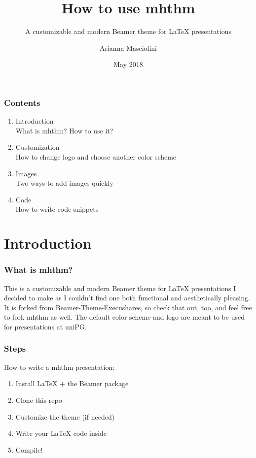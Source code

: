 \documentclass{beamer}
\title{How to use mhthm}
\subtitle{A customizable and modern Beamer theme for LaTeX presentations}
\author{Arianna Masciolini}
\institute{UniPG}
\date{May 2018}
\begin{document}
	\setcounter{showProgressBar}{0}
	\setcounter{showSlideNumbers}{0}

	\frame{\titlepage}

	\begin{frame}
		\frametitle{Contents}
		\begin{enumerate}
			\item Introduction \\ {\footnotesize\hspace{1em} What is mhthm? How to use it?}
			\item Customization \\ {\footnotesize\hspace{1em} How to change logo and choose another color scheme}
			\item Images \\ {\footnotesize\hspace{1em} Two ways to add images quickly}
			\item Code \\ {\footnotesize\hspace{1em} How to write code snippets}
		\end{enumerate}
	\end{frame}

	\setcounter{framenumber}{0}
	\setcounter{showProgressBar}{1}
	\setcounter{showSlideNumbers}{1}
	\section{Introduction}
	\begin{frame}
		\frametitle{What is mhthm?}
		This is a customizable and modern Beamer theme for LaTeX presentations I decided to make as I couldn't find one both functional and aesthetically pleasing. It is forked from \href{https://github.com/FuzzyWuzzie/Beamer-Theme-Execushares}{Beamer-Theme-Execushares}, so check that out, too, and feel free to fork mhthm as well.
		The default color scheme and logo are meant to be used for presentations at uniPG.
	\end{frame}
	\begin{frame}
		\frametitle{Steps}
		How to write a mhthm presentation:
		\begin{enumerate}
			\item Install LaTeX + the Beamer package
			\item Clone this repo
			\item Customize the theme (if needed)
			\item Write your LaTeX code inside \code{presentation.tex}
			\item Compile!
		\end{enumerate}
	\end{frame}
\end{document}
